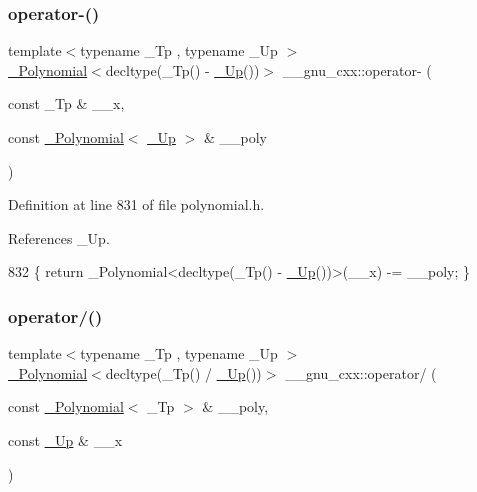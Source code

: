 \subsubsection{\texorpdfstring{operator-\/()}{operator-()}\hspace{0.1cm}{\footnotesize\ttfamily [3/3]}}
{\footnotesize\ttfamily template$<$typename \+\_\+\+Tp , typename \+\_\+\+Up $>$ \\
\hyperlink{class____gnu__cxx_1_1__Polynomial}{\+\_\+\+Polynomial}$<$decltype(\+\_\+\+Tp() -\/ \hyperlink{namespace____gnu__cxx_ab693ea357b6429b331e0bf09f9442385}{\+\_\+\+Up}())$>$ \+\_\+\+\_\+gnu\+\_\+cxx\+::operator-\/ (\begin{DoxyParamCaption}\item[{const \+\_\+\+Tp \&}]{\+\_\+\+\_\+x,  }\item[{const \hyperlink{class____gnu__cxx_1_1__Polynomial}{\+\_\+\+Polynomial}$<$ \hyperlink{namespace____gnu__cxx_ab693ea357b6429b331e0bf09f9442385}{\+\_\+\+Up} $>$ \&}]{\+\_\+\+\_\+poly }\end{DoxyParamCaption})\hspace{0.3cm}{\ttfamily [inline]}}



Definition at line 831 of file polynomial.\+h.



References \+\_\+\+Up.


\begin{DoxyCode}
832     \{ \textcolor{keywordflow}{return} \_Polynomial<decltype(\_Tp() - \hyperlink{namespace____gnu__cxx_ab693ea357b6429b331e0bf09f9442385}{\_Up}())>(\_\_x) -= \_\_poly; \}
\end{DoxyCode}
\mbox{\label{namespace____gnu__cxx_a5fd356349013bd60a41010cbf502444b}} 
\subsubsection{\texorpdfstring{operator/()}{operator/()}\hspace{0.1cm}{\footnotesize\ttfamily [1/3]}}
{\footnotesize\ttfamily template$<$typename \+\_\+\+Tp , typename \+\_\+\+Up $>$ \\
\hyperlink{class____gnu__cxx_1_1__Polynomial}{\+\_\+\+Polynomial}$<$decltype(\+\_\+\+Tp() / \hyperlink{namespace____gnu__cxx_ab693ea357b6429b331e0bf09f9442385}{\+\_\+\+Up}())$>$ \+\_\+\+\_\+gnu\+\_\+cxx\+::operator/ (\begin{DoxyParamCaption}\item[{const \hyperlink{class____gnu__cxx_1_1__Polynomial}{\+\_\+\+Polynomial}$<$ \+\_\+\+Tp $>$ \&}]{\+\_\+\+\_\+poly,  }\item[{const \hyperlink{namespace____gnu__cxx_ab693ea357b6429b331e0bf09f9442385}{\+\_\+\+Up} \&}]{\+\_\+\+\_\+x }\end{DoxyParamCaption})\hspace{0.3cm}{\ttfamily [inline]}}

